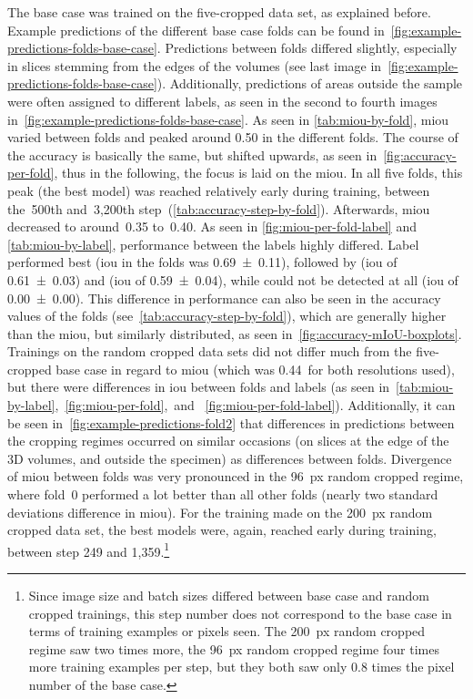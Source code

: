 The base case was trained on the five-cropped data set, as explained before.
Example predictions of the different base case folds can be found in~\autoref{fig:example-predictions-folds-base-case}.
Predictions between folds differed slightly, especially in slices stemming from the edges of the volumes (see last image in~\autoref{fig:example-predictions-folds-base-case}).
Additionally, predictions of areas outside the sample were often assigned to different labels, as seen in the second to fourth images in~\autoref{fig:example-predictions-folds-base-case}.
As seen in \autoref{tab:miou-by-fold}, \gls{miou} varied between folds and peaked around 0.50 in the different folds.
The course of the accuracy is basically the same, but shifted upwards, as seen in~\autoref{fig:accuracy-per-fold}, thus in the following, the focus is laid on the \gls{miou}.
In all five folds, this peak (the best model) was reached relatively early during training, between the~500th and~3,200th step~(\autoref{tab:accuracy-step-by-fold}).
Afterwards, \gls{miou} decreased to around~0.35 to~0.40.
As seen in \autoref{fig:miou-per-fold-label} and \autoref{tab:miou-by-label}, performance between the labels highly differed.
Label  performed best (\gls{iou} in the folds was 0.69~±~0.11), followed by  (\gls{iou} of 0.61~±~0.03) and  (\gls{iou} of 0.59~±~0.04), while  could not be detected at all (\gls{iou} of 0.00~±~0.00).
This difference in performance can also be seen in the accuracy values of the folds (see~\autoref{tab:accuracy-step-by-fold}), which are generally higher than the \gls{miou}, but similarly distributed, as seen in~\autoref{fig:accuracy-mIoU-boxplots}.
\afterpage{\FloatBarrier}
Trainings on the random cropped data sets did not differ much from the five-cropped base case in regard to \gls{miou} (which was 0.44~for both resolutions used), but there were differences in \gls{iou} between folds and labels (as seen in~\autoref{tab:miou-by-label},~\autoref{fig:miou-per-fold},~and ~\autoref{fig:miou-per-fold-label}).
Additionally, it can be seen in~\autoref{fig:example-predictions-fold2} that differences in predictions between the cropping regimes occurred on similar occasions (on slices at the edge of the 3D volumes, and outside the specimen) as differences between folds.
Divergence of \gls{miou} between folds was very pronounced in the 96~px random cropped regime, where fold~0 performed a lot better than all other folds (nearly two standard deviations difference in \gls{miou}).
For the training made on the 200~px random cropped data set, the best models were, again, reached early during training, between step 249 and 1,359.\footnote{Since image size and batch sizes differed between base case and random cropped trainings, this step number does not correspond to the base case in terms of training examples or pixels seen.
The 200~px random cropped regime saw two times more, the 96~px random cropped regime four times more training examples per step, but they both saw only 0.8 times the pixel number of the base case.}


